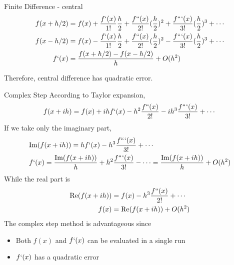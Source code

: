 \documentclass{beamer}
\begin{document}
\begin{frame}{Finite Difference - central}
\begin{equation*}
\begin{split}
    f(x+h/2) &= f(x) + \frac{f`(x)}{1!}\frac{h}{2} + \frac{f``(x)}{2!}(\frac{h}{2})^2 + \frac{f```(x)}{3!}(\frac{h}{2})^3 + \cdots \\
    f(x-h/2) &= f(x) - \frac{f`(x)}{1!}\frac{h}{2} + \frac{f``(x)}{2!}(\frac{h}{2})^2 - \frac{f```(x)}{3!}(\frac{h}{2})^3 + \cdots \\
    f`(x) &= \frac{f(x+h/2) - f(x-h/2)}{h} + O(h^2)       
\end{split}
\end{equation*}

Therefore, central difference has quadratic error.

\end{frame}

\begin{frame}{Complex Step}
According to Taylor expansion,
\begin{equation*}
    f(x+ih) = f(x) + ihf`(x) - h^2\frac{f``(x)}{2!} - ih^3\frac{f```(x)}{3!} + \cdots 
\end{equation*}
\pause
If we take only the imaginary part,
\begin{equation*}
\begin{split}
    &\textrm{Im} (f(x+ih)) = hf`(x) -  h^3\frac{f```(x)}{3!} + \cdots \\
    &f`(x) = \frac{\textrm{Im}(f(x+ih))}{h} + h^2\frac{f```(x)}{3!} - \cdots = \frac{\textrm{Im}(f(x+ih))}{h} + O(h^2)      
\end{split}
\end{equation*}
\pause
While the real part is
\begin{equation*}
\begin{split}
		\textrm{Re}(f(x+ih)) &= f(x) - h^3\frac{f``(x)}{2!} + \cdots \\
		f(x) &= \textrm{Re}(f(x+ih)) + O(h^2)
\end{split}    
\end{equation*}
\pause
The complex step method is advantageous since 

\begin{itemize}
    \item Both $f(x)$ and $f`(x)$ can be evaluated in a single run
    \item $f`(x)$ has a quadratic error
\end{itemize}

\end{frame}
\end{document}
